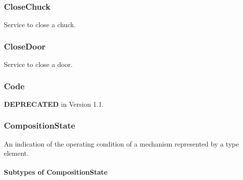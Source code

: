 \subsubsection{CloseChuck}
\label{sec:CloseChuck}



Service to close a chuck.



\subsubsection{CloseDoor}
\label{sec:CloseDoor}



Service to close a door.



\subsubsection{Code}
\label{sec:Code}



\textbf{DEPRECATED} in Version 1.1.



\subsubsection{CompositionState}
\label{sec:CompositionState}



An indication of the operating condition of a mechanism represented by a  type element.


\paragraph{Subtypes of CompositionState}\mbox{}
\label{sec:Subtypes of CompositionState}

